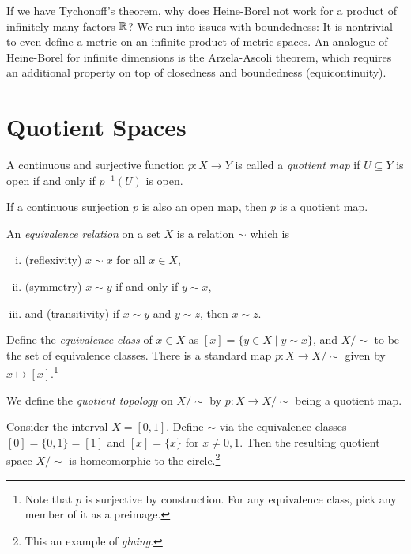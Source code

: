 \begin{remark}
  If we have Tychonoff's theorem, why does Heine-Borel
  not work for a product of infinitely many factors
  $\mathbb{R}$? We run into issues with boundedness: It is
  nontrivial to even define a metric on an infinite
  product of metric spaces. An analogue of
  Heine-Borel for infinite dimensions is the
  Arzela-Ascoli theorem, which requires an additional
  property on top of closedness and boundedness
  (equicontinuity).
\end{remark}

\section{Quotient Spaces}

\begin{definition}
  A continuous and surjective function
  $p : X \to Y$ is called
  a \emph{quotient map} if $U \subseteq Y$ is
  open if and only if $p^{-1}(U)$ is open.
\end{definition}

\begin{example}
  If a continuous surjection $p$ is also an open
  map, then $p$ is a quotient map.
\end{example}

\begin{definition}
  An \emph{equivalence relation} on a set $X$ is a
  relation $\sim$ which is
  \begin{enumerate}[(i)]
    \item (reflexivity) $x \sim x$ for all $x \in X$,
    \item (symmetry) $x \sim y$ if and only if
      $y \sim x$,
    \item and (transitivity) if $x \sim y$ and
      $y \sim z$, then $x \sim z$.
  \end{enumerate}
  Define the \emph{equivalence class} of $x \in X$
  as $[x] = \{y \in X \mid y \sim x\}$, and
  $X / {\sim}$ to be the set of equivalence classes.
  There is a standard map $p : X \to X / {\sim}$
  given by $x \mapsto [x]$.\footnote{Note that $p$ is surjective by construction. For any equivalence class, pick any member of it as a preimage.}
\end{definition}

\begin{definition}
  We define the \emph{quotient topology} on $X / {\sim}$ by
  $p : X \to X / {\sim}$ being a quotient map.
\end{definition}

\begin{example}
  Consider the interval $X = [0, 1]$. Define $\sim$
  via the
  equivalence classes $[0] = \{0, 1\} = [1]$ and
  $[x] = \{x\}$ for $x \ne 0, 1$. Then the resulting
  quotient space $X / {\sim}$ is homeomorphic to
  the circle.\footnote{This an example of \emph{gluing}.}
\end{example}
